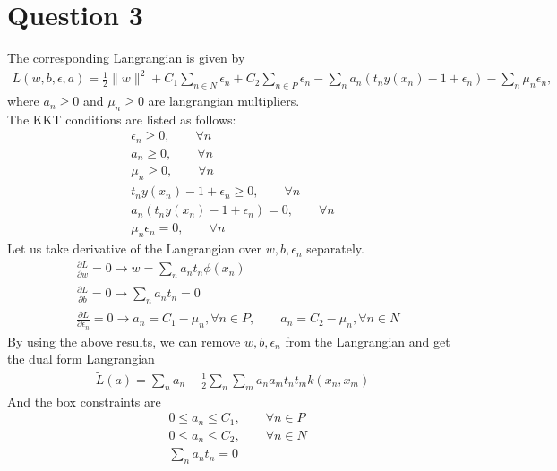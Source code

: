 \documentclass[paper=a4, fontsize=15pt]{article} %
\begin{document}
\section*{Question 3}
The corresponding Langrangian is given by
\begin{align*}
L(w,b,\epsilon, a) = \frac{1}{2}\lVert{w}\rVert^2 +  C_1 \sum_{n \in N}{\epsilon_n}
+ C_2 \sum_{n \in P}{\epsilon_n}
- \sum_n a_n (t_n y(x_n) -1 + \epsilon_n)
- \sum_n \mu_n \epsilon_n,
\end{align*}
where $a_n \geq 0$ and $\mu_n \geq 0$ are langrangian multipliers.\\
The KKT conditions are listed as follows:
\begin{align*}
\epsilon_n \geq 0,  \qquad \forall n\\
a_n \geq 0, \qquad \forall n\\
\mu_n  \geq 0, \qquad \forall n\\
t_n y(x_n) -1 + \epsilon_n \geq 0, \qquad \forall n\\
a_n (t_n y(x_n) -1 + \epsilon_n) = 0, \qquad \forall n \\
\mu_n \epsilon_n = 0, \qquad \forall n
\end{align*}
Let us take derivative of the Langrangian over $w,b,\epsilon_n$ separately.
\begin{align*}
& \frac{\partial L}{\partial w} = 0  \xrightarrow[]{ } w = \sum_n a_n t_n \phi(x_n) \\
&  \frac{\partial L}{\partial b} = 0  \xrightarrow[]{ } \sum_n a_n t_n = 0 \\
&   \frac{\partial L}{\partial \epsilon_n} = 0  \xrightarrow[]{ }
a_n = C_1 - \mu_n, \forall n \in P, \qquad
a_n = C_2 - \mu_n,  \forall n \in N
\end{align*}
By using the above results, we can remove $w,b,\epsilon_n$ from the Langrangian and get the dual form Langrangian
\begin{align*}
\tilde{L}(a) = \sum_n a_n - \frac{1}{2}\sum_n \sum_m a_n a_m t_n t_m k(x_n,x_m)
\end{align*}
And the box constraints are 
\begin{align*}
& 0 \leq a_n \leq C_1, \qquad \forall n \in P\\
& 0 \leq a_n \leq C_2, \qquad \forall n \in N \\
& \sum_n a_n t_n = 0
\end{align*}
\end{document}
